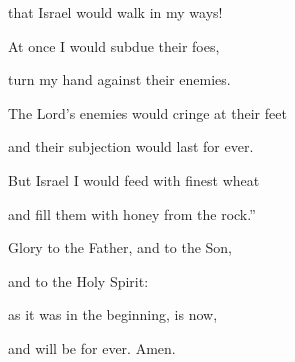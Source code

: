 that Israel would walk in my ways!

\noindent At once I would subdue their foes,~\GreStar{}~\nopagebreak

turn my hand against their enemies.

\noindent The Lord’s enemies would cringe at their feet~\GreStar{}~\nopagebreak

and their subjection would last for ever.

\noindent But Israel I would feed with finest wheat~\GreStar{}~\nopagebreak

and fill them with honey from the rock.”

\noindent Glory to the Father, and to the Son,~\GreStar{}~\nopagebreak

and to the Holy Spirit:

\noindent as it was in the beginning, is now,~\GreStar{}~\nopagebreak

and will be for ever. Amen.
